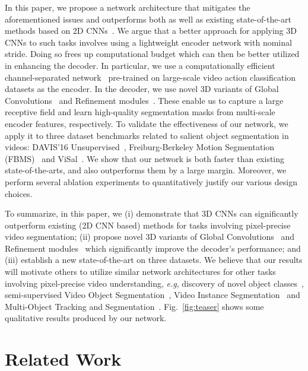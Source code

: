 \documentclass{bmvc2k}
\makeatletter
\newcommand*{\eg}{\emph{e.g.}\@\xspace}
\def\eg{\emph{e.g}\bmvaOneDot}
\makeatother
\begin{document}
In this paper, we propose a network architecture that mitigates the aforementioned issues and outperforms both \cite{Hou19BMVC} as well as existing state-of-the-art methods based on 2D CNNs~\cite{Jain17CVPR, Tokmakov17ICCV, Yang19ICCVAnchorDiff, Wang19ICCV}. We argue that a better approach for applying 3D CNNs to such tasks involves using a lightweight encoder network with nominal stride. Doing so frees up computational budget which can then be better utilized in enhancing the decoder. In particular, we use a computationally efficient channel-separated network~\cite{Tran19ICCV} pre-trained on large-scale video action classification datasets as the encoder. In the decoder, we use novel 3D variants of Global Convolutions~\cite{Peng17CVPR} and Refinement modules~\cite{Pinheiro16ECCV,Wug18CVPR}. These enable us to capture a large receptive field and learn high-quality segmentation masks from multi-scale encoder features, respectively.
To validate the effectiveness of our network, we apply it to three dataset benchmarks related to salient object segmentation in videos: DAVIS'16 Unsupervised~\cite{Perazzi16CVPR}, Freiburg-Berkeley Motion Segmentation (FBMS)~\cite{Ochs13TPAMI} and ViSal~\cite{Wang15TIP}. We show that our network is both faster than existing state-of-the-arts, and also outperforms them by a large margin. Moreover, we perform several ablation experiments to quantitatively justify our various design choices.

To summarize, in this paper, we (i) demonstrate that 3D CNNs can significantly outperform existing (2D CNN based) methods for tasks involving pixel-precise video segmentation; (ii) propose novel 3D variants of Global Convolutions~\cite{Peng17CVPR} and Refinement modules~\cite{Pinheiro16ECCV,Wug18CVPR} which significantly improve the decoder's performance; and (iii) establish a new state-of-the-art on three datasets.
We believe that our results will motivate others to utilize similar network architectures for other tasks involving pixel-precise video understanding, \eg, discovery of novel object classes~\cite{Xiao16CVPR, Osep19ICRA, Wang14ECCV, Kwak15ICCV}, semi-supervised Video Object Segmentation~\cite{Caelles17CVPR}, Video Instance Segmentation~\cite{Yang19ICCV} and Multi-Object Tracking and Segmentation~\cite{Voigtlaender19CVPR}. 
Fig.~\ref{fig:teaser} shows some qualitative results produced by our network. 
\section{Related Work}
\label{sec:related_work}
\end{document}
